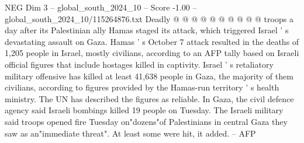 \begin{textsample}{NEG Dim 3 – global\_south\_2024\_10 – Score -1.00 – global\_south\_2024\_10/115264876.txt}
Deadly @ @ @ @ @ @ @ @ @ @ troops a day after its Palestinian ally Hamas staged its attack, which triggered Israel ' s devastating assault on Gaza.
Hamas ' s October 7 attack resulted in the deaths of 1,205 people in Israel, mostly civilians, according to an AFP tally based on Israeli official figures that include hostages killed in captivity.
Israel ' s retaliatory military offensive has killed at least 41,638 people in Gaza, the majority of them civilians, according to figures provided by the Hamas-run territory ' s health ministry.
The UN has described the figures as reliable.
In Gaza, the civil defence agency said Israeli bombings killed 19 people on Tuesday.
The Israeli military said troops opened fire Tuesday on"dozens"of Palestinians in central Gaza they saw as an"immediate threat".
At least some were hit, it added. -- AFP

\end{textsample}
